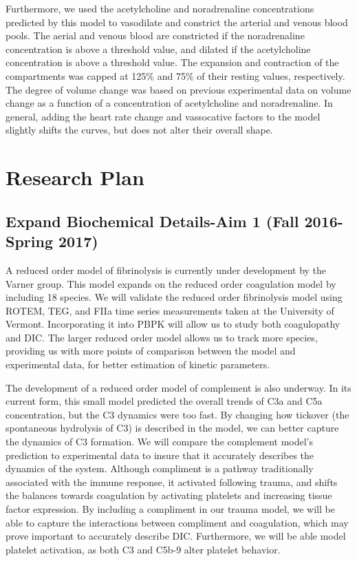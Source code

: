 \documentclass[12pt]{article}
\begin{document}
Furthermore, we used the acetylcholine and noradrenaline concentrations predicted by this model to vasodilate and constrict the arterial and venous blood pools. The aerial and venous blood are constricted if the noradrenaline concentration is above a threshold value, and dilated if the acetylcholine concentration is above a threshold value. The expansion and contraction of the compartments was capped at 125\% and 75\% of their resting values, respectively. The degree of volume change was based on previous experimental data on volume change as a function of a concentration of acetylcholine and noradrenaline.\cite{chowienczyk1994blood,dora1983effect} In general, adding the heart rate change and vassocative factors to the model slightly shifts the curves, but does not alter their overall shape.
\section*{Research Plan}
\subsection*{Expand Biochemical Details-Aim 1 (Fall 2016-Spring 2017)}
A reduced order model of fibrinolysis is currently under development by the Varner group. This model expands on the reduced order coagulation model by including 18 species. We will validate the reduced order fibrinolysis model using ROTEM, TEG, and FIIa time series measurements taken at the University of Vermont. Incorporating it into PBPK will allow us to study both coagulopathy and DIC. The larger reduced order model allows us to track more species, providing us with more points of comparison between the model and experimental data, for better estimation of kinetic parameters. 

The development of a reduced order model of complement is also underway. In its current form, this small model predicted the overall trends of C3a and C5a concentration, but the C3 dynamics were too fast. By changing how tickover (the spontaneous hydrolysis of C3) is described in the model, we can better capture the dynamics of C3 formation.  We will compare the complement model's prediction to experimental data to insure that it accurately describes the dynamics of the system.\cite{morad2015time} Although compliment is a pathway traditionally associated with the immune response, it activated following trauma, and shifts the balances towards coagulation by activating platelets and increasing tissue factor expression. \cite{markiewski2007complement} By including a compliment in our trauma model, we will be able to capture the interactions between compliment and coagulation, which may prove important to accurately describe DIC. Furthermore, we will be able model platelet activation, as both C3 and C5b-9 alter platelet behavior.\cite{peerschke2008platelet} 
\end{document}
